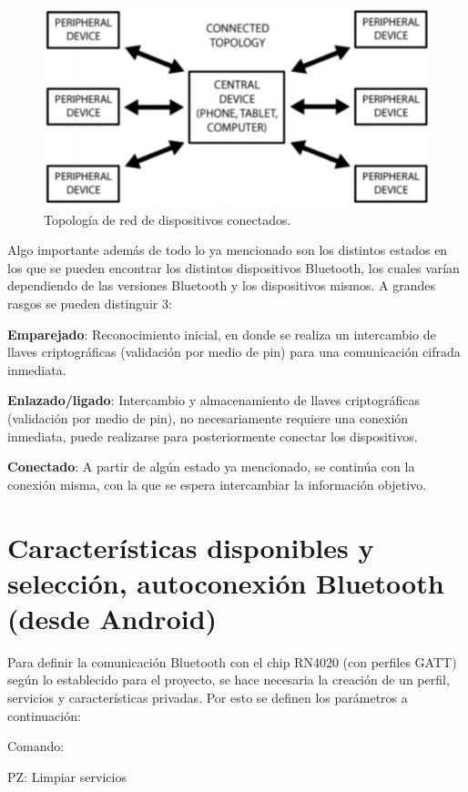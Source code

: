 \begin{figure}[H]
	\centering
	\includegraphics[scale=0.4]{figuras/rn4020/topologia.png}
	\caption{ Topología de red de dispositivos conectados.}
	\label{topologia}
\end{figure}

Algo importante además de todo lo ya mencionado son los distintos estados en los que se pueden encontrar los distintos dispositivos Bluetooth, los cuales varían dependiendo de las versiones Bluetooth y los dispositivos mismos. A grandes rasgos se pueden distinguir 3:

\textbf{Emparejado}: Reconocimiento inicial, en donde se realiza un intercambio de llaves criptográficas (validación por medio de pin) para una comunicación cifrada inmediata.

\textbf{Enlazado/ligado}: Intercambio y almacenamiento de llaves criptográficas (validación por medio de pin), no necesariamente requiere una conexión inmediata, puede realizarse para posteriormente conectar los dispositivos.

\textbf{Conectado}: A partir de algún estado ya mencionado, se continúa con la conexión misma, con la que se espera intercambiar la información objetivo.
\newpage

\section{Características disponibles y selección, autoconexión Bluetooth (desde Android)}

Para definir la comunicación Bluetooth con el chip RN4020 (con perfiles GATT) según lo establecido para el proyecto, se hace necesaria la creación de un perfil, servicios y características privadas. Por esto se definen los parámetros a continuación:

Comando: 

	PZ: Limpiar servicios
	
